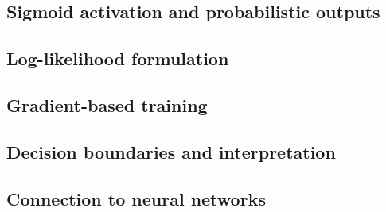 \subsection{Sigmoid activation and probabilistic outputs}
\subsection{Log-likelihood formulation}
\subsection{Gradient-based training}
\subsection{Decision boundaries and interpretation}
\subsection{Connection to neural networks}

